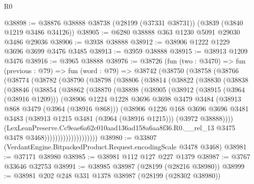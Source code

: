 \begin{lexlean}{R0}
\begin{coremodule}
@38898 := @38876 @38888 @38738 (@28199 (@37331 @38731)) (@3839 (@3840 @1219 @3486 @34126))
@38905 := @6280 @38888 @363 @1230 @5091 @29030 @3486 @29036
@38906 := @3938 @38888
@38912 := @38906 @1222 @1229 @3696 @3699 @3476 @3485
@38913 := @3959 @38888
@38915 := @38913 @1209 @3476
@38916 := @3965 @38888
@38976 := @38726
    (fun (two : @3470) =>
    fun (previous : @79) =>
    fun (word : @79) =>
    @38742
      (@38750
        (@38758
          (@38766
            (@38774
              (@38782
                (@38790
                  (@38798
                    (@38806
                      (@38814
                        (@38822
                          (@38830
                            (@38838
                              (@38846
                                (@38854
                                  (@38862
                                    (@38870
                                      (@38898
                                        (@38905
                                          (@38912
                                            (@38915 (@3964 (@38916 @1209)))
                                            (@38906
                                              @1224
                                              @1228
                                              @3696
                                              @3698
                                              @3479
                                              @3484
                                              (@38913 @868 @3479 (@3964 (@38916 @868)))
                                              (@38906
                                                @1226
                                                @168
                                                @3696
                                                @3696
                                                @3481
                                                @3483
                                                (@38913 @1215 @3481 (@3964 (@38916 @1215)))
                                                (@3972 @38888))))
                                          (LexLeanPreserve.Cc9eae6a62c010aad136ad158a6aa8f36.R0.__rel_13
                                            @3475
                                            @3478
                                            @3468))))))))))))))))))))
@38980 := @33807 (VerdantEngine.BitpackedProduct.Request.encodingScale @3478 @3468)
@38981 := @37171 @38980
@38985 := @38981 @112 @127 @227 @1379
@38987 := @3767 @33646 @32753
@38991 := @38985 @38987 (@28199 (@28216 @38980))
@38999 := @38981 @202 @248 @331 @1378 @38987 (@28199 (@28302 @38980))

\end{coremodule}
\end{lexlean}
